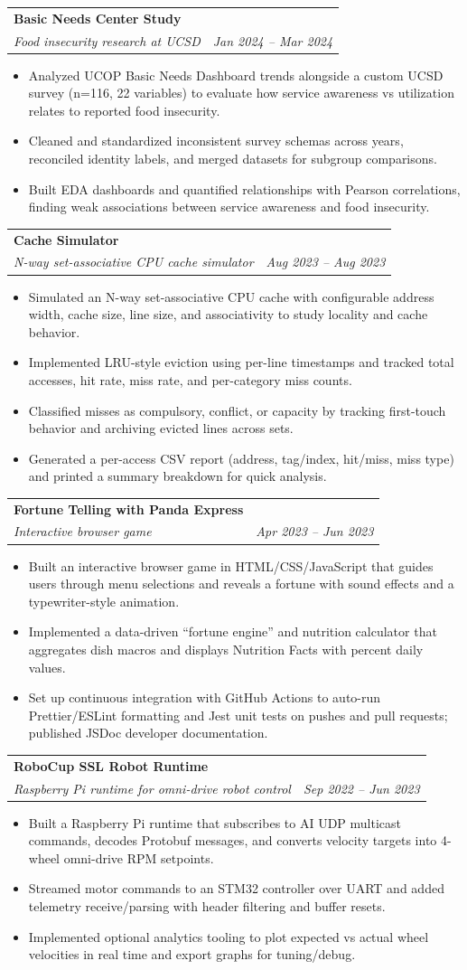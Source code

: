 \documentclass[letterpaper,11pt]{article}
\makeatletter
\newcommand{\resumeItem}[1]{
  \item\small{
    {#1 \vspace{-2pt}}
  }
}
\newcommand{\resumeSubheading}[4]{
  \vspace{-1pt}\item
    \begin{tabular*}{0.97\textwidth}[t]{l@{\extracolsep{\fill}}r}
      \textbf{#1} & #2 \\
      \textit{\small#3} & \textit{\small #4} \\
    \end{tabular*}\vspace{-5pt}
}
\newcommand{\resumeItemListStart}{\begin{itemize}}
\newcommand{\resumeItemListEnd}{\end{itemize}\vspace{-5pt}}
\makeatother
\begin{document}
    \resumeSubheading
      {Basic Needs Center Study}{}
      {Food insecurity research at UCSD}{Jan 2024 -- Mar 2024}
      \resumeItemListStart
        \resumeItem{Analyzed UCOP Basic Needs Dashboard trends alongside a custom UCSD survey (n=116, 22 variables) to evaluate how service awareness vs utilization relates to reported food insecurity.}
        \resumeItem{Cleaned and standardized inconsistent survey schemas across years, reconciled identity labels, and merged datasets for subgroup comparisons.}
        \resumeItem{Built EDA dashboards and quantified relationships with Pearson correlations, finding weak associations between service awareness and food insecurity.}
      \resumeItemListEnd

    \resumeSubheading
      {Cache Simulator}{}
      {N-way set-associative CPU cache simulator}{Aug 2023 -- Aug 2023}
      \resumeItemListStart
        \resumeItem{Simulated an N-way set-associative CPU cache with configurable address width, cache size, line size, and associativity to study locality and cache behavior.}
        \resumeItem{Implemented LRU-style eviction using per-line timestamps and tracked total accesses, hit rate, miss rate, and per-category miss counts.}
        \resumeItem{Classified misses as compulsory, conflict, or capacity by tracking first-touch behavior and archiving evicted lines across sets.}
        \resumeItem{Generated a per-access CSV report (address, tag/index, hit/miss, miss type) and printed a summary breakdown for quick analysis.}
      \resumeItemListEnd

    \resumeSubheading
      {Fortune Telling with Panda Express}{}
      {Interactive browser game}{Apr 2023 -- Jun 2023}
      \resumeItemListStart
        \resumeItem{Built an interactive browser game in HTML/CSS/JavaScript that guides users through menu selections and reveals a fortune with sound effects and a typewriter-style animation.}
        \resumeItem{Implemented a data-driven ``fortune engine'' and nutrition calculator that aggregates dish macros and displays Nutrition Facts with percent daily values.}
        \resumeItem{Set up continuous integration with GitHub Actions to auto-run Prettier/ESLint formatting and Jest unit tests on pushes and pull requests; published JSDoc developer documentation.}
      \resumeItemListEnd

    \resumeSubheading
      {RoboCup SSL Robot Runtime}{}
      {Raspberry Pi runtime for omni-drive robot control}{Sep 2022 -- Jun 2023}
      \resumeItemListStart
        \resumeItem{Built a Raspberry Pi runtime that subscribes to AI UDP multicast commands, decodes Protobuf messages, and converts velocity targets into 4-wheel omni-drive RPM setpoints.}
        \resumeItem{Streamed motor commands to an STM32 controller over UART and added telemetry receive/parsing with header filtering and buffer resets.}
        \resumeItem{Implemented optional analytics tooling to plot expected vs actual wheel velocities in real time and export graphs for tuning/debug.}
      \resumeItemListEnd
\end{document}

